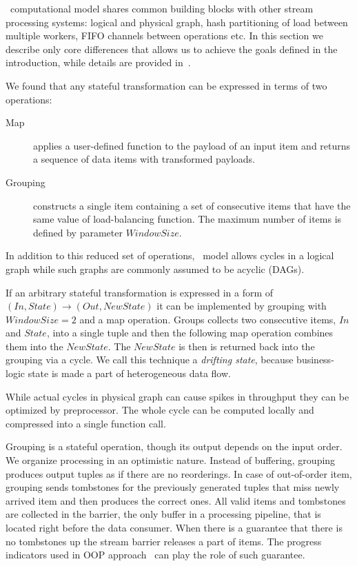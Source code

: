 \label {fs-short-model}

\FlameStream\ computational model shares common building blocks with other stream processing systems: logical and physical graph, hash partitioning of load between multiple workers, FIFO channels between operations etc. In this section we describe only core differences that allows us to achieve the goals defined in the introduction, while details are provided in~\cite{we2018seim}.

We found that any stateful transformation can be expressed in terms of two operations:

\begin {description}
  \item [Map] applies a user-defined function to the payload of an input item and returns a sequence of data items with transformed payloads. 
  \item [Grouping] constructs a single item containing a set of consecutive items that have the same value of load-balancing function. The maximum number of items is defined by parameter $Window Size$. 
\end {description}

In addition to this reduced set of operations, \FlameStream\ model allows cycles in a logical graph while such graphs are commonly assumed to be acyclic (DAGs).

If an arbitrary stateful transformation is expressed in a form of $(In, State) \rightarrow (Out, NewState)$ it can be implemented by grouping with $WindowSize = 2$ and a map operation. Groups collects two consecutive items, $In$ and $State$, into a single tuple and then the following map operation combines them into the $NewState$. The $NewState$ is then is returned back into the grouping via a cycle. We call this technique a {\it drifting state}, because business-logic state is made a part of heterogeneous data flow.

While actual cycles in physical graph can cause spikes in throughput they can be optimized by preprocessor. The whole cycle can be computed locally and compressed into a single function call.

Grouping is a stateful operation, though its output depends on the input order. We organize processing in an optimistic nature. Instead of buffering, grouping produces output tuples as if there are no reorderings. In case of out-of-order item, grouping sends tombstones for the previously generated tuples that miss newly arrived item and then produces the correct ones. All valid items and tombstones are collected in the barrier, the only buffer in a processing pipeline, that is located right before the data consumer. When there is a guarantee that there is no tombstones up the stream barrier releases a part of items. The progress indicators used in OOP approach~\cite{Li:2008:OPN:1453856.1453890} can play the role of such guarantee.
